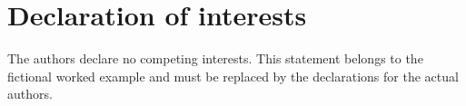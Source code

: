 \section{Declaration of interests}
The authors declare no competing interests. This statement belongs to the
fictional worked example and must be replaced by the declarations for the actual
authors.
